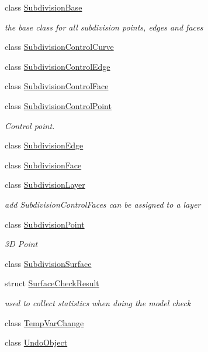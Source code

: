 \begin{DoxyCompactItemize}
class \hyperlink{classShipCAD_1_1SubdivisionBase}{Subdivision\+Base}
\begin{DoxyCompactList}\small\item\em the base class for all subdivision points, edges and faces \end{DoxyCompactList}\item 
class \hyperlink{classShipCAD_1_1SubdivisionControlCurve}{Subdivision\+Control\+Curve}
\item 
class \hyperlink{classShipCAD_1_1SubdivisionControlEdge}{Subdivision\+Control\+Edge}
\item 
class \hyperlink{classShipCAD_1_1SubdivisionControlFace}{Subdivision\+Control\+Face}
\item 
class \hyperlink{classShipCAD_1_1SubdivisionControlPoint}{Subdivision\+Control\+Point}
\begin{DoxyCompactList}\small\item\em Control point. \end{DoxyCompactList}\item 
class \hyperlink{classShipCAD_1_1SubdivisionEdge}{Subdivision\+Edge}
\item 
class \hyperlink{classShipCAD_1_1SubdivisionFace}{Subdivision\+Face}
\item 
class \hyperlink{classShipCAD_1_1SubdivisionLayer}{Subdivision\+Layer}
\begin{DoxyCompactList}\small\item\em add Subdivision\+Control\+Faces can be assigned to a layer \end{DoxyCompactList}\item 
class \hyperlink{classShipCAD_1_1SubdivisionPoint}{Subdivision\+Point}
\begin{DoxyCompactList}\small\item\em 3D Point \end{DoxyCompactList}\item 
class \hyperlink{classShipCAD_1_1SubdivisionSurface}{Subdivision\+Surface}
\item 
struct \hyperlink{structShipCAD_1_1SurfaceCheckResult}{Surface\+Check\+Result}
\begin{DoxyCompactList}\small\item\em used to collect statistics when doing the model check \end{DoxyCompactList}\item 
class \hyperlink{classShipCAD_1_1TempVarChange}{Temp\+Var\+Change}
\item 
class \hyperlink{classShipCAD_1_1UndoObject}{Undo\+Object}

\end{DoxyCompactItemize}

